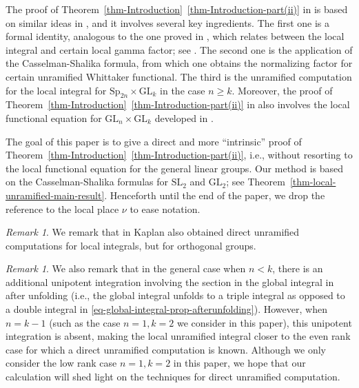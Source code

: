 \documentclass[11pt]{amsart}
\theoremstyle{definition}
\theoremstyle{remark}
\newtheorem{remark}[theorem]{Remark}
\newcommand{\GL}{\mathrm{GL}}
\newcommand{\SL}{\mathrm{SL}}
\newcommand{\Sp}{\mathrm{Sp}}
\begin{document}
The proof of Theorem~\ref{thm-Introduction}~\ref{thm-Introduction-part(ii)} in \cite{GinzburgRallisSoudry1998} is based on similar ideas in \cite{Soudry1993}, and it
involves several key ingredients. The first one is a formal identity, analogous to the one proved in \cite[Section 11.4]{Soudry1993}, which relates between the local integral and certain local gamma factor; see \cite[Proposition 6.1]{GinzburgRallisSoudry1998}. The second one is the application of the Casselman-Shalika formula, from which one obtains the normalizing factor for certain unramified Whittaker functional. The third is the unramified computation for the local integral for $\Sp_{2n}\times \GL_k$ in the case $n\ge k$. Moreover, the proof of Theorem~\ref{thm-Introduction}~\ref{thm-Introduction-part(ii)} in \cite{GinzburgRallisSoudry1998}  also involves the local functional equation for $\mathrm{GL}_n\times \mathrm{GL}_k$ developed in \cite{JacquetPiatetski-ShapiroShalika1983}. 

The goal of this paper is to give a direct and more ``intrinsic'' proof of Theorem~\ref{thm-Introduction}~\ref{thm-Introduction-part(ii)}, i.e., without resorting to the local functional equation for the general linear groups. 
Our method is based on the Casselman-Shalika formulas for $\SL_2$ and $\GL_2$; see Theorem~\ref{thm-local-unramified-main-result}. Henceforth until the end of the paper, we drop the reference to the local place $\nu$ to ease notation. 


\begin{remark}
We remark that in \cite{Kaplan2010, Kaplan2012} Kaplan also obtained direct unramified computations for local integrals, but for orthogonal groups.
\end{remark}

\begin{remark}
We also remark that in the general case when $n<k$, there is an additional unipotent integration involving the section in the global integral in \cite{GinzburgRallisSoudry1998} after unfolding (i.e., the global integral unfolds to a triple integral as opposed to a double integral in \eqref{eq-global-integral-prop-afterunfolding}). However, when $n=k-1$ (such as the case $n=1, k=2$ we consider in this paper), this unipotent integration is absent, making the local unramified integral closer to the even rank case for which a direct unramified computation is known. Although we only consider the low rank case $n=1, k=2$ in this paper, we hope that our calculation will shed light on the techniques for direct unramified computation. 
\end{remark}
\end{document}
